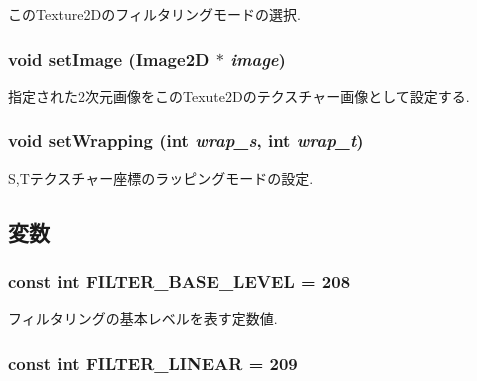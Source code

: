 このTexture2Dのフィルタリングモードの選択. \hypertarget{classm3g_1_1Texture2D_705b89b41cd1b38f664ed912be44baaa}{
\subsubsection[{setImage}]{\setlength{\rightskip}{0pt plus 5cm}void setImage ({\bf Image2D} $\ast$ {\em image})}}
\label{classm3g_1_1Texture2D_705b89b41cd1b38f664ed912be44baaa}


指定された2次元画像をこのTexute2Dのテクスチャー画像として設定する. \hypertarget{classm3g_1_1Texture2D_e676f34bd2f5ee1508ad1cb771702d8f}{
\subsubsection[{setWrapping}]{\setlength{\rightskip}{0pt plus 5cm}void setWrapping (int {\em wrap\_\-s}, \/  int {\em wrap\_\-t})}}
\label{classm3g_1_1Texture2D_e676f34bd2f5ee1508ad1cb771702d8f}


S,Tテクスチャー座標のラッピングモードの設定. 

\subsection{変数}
\hypertarget{classm3g_1_1Texture2D_d1924d32385b5353ad11ecd8b1ec0ad5}{
\subsubsection[{FILTER\_\-BASE\_\-LEVEL}]{\setlength{\rightskip}{0pt plus 5cm}const int {\bf FILTER\_\-BASE\_\-LEVEL} = 208}}
\label{classm3g_1_1Texture2D_d1924d32385b5353ad11ecd8b1ec0ad5}


フィルタリングの基本レベルを表す定数値. \hypertarget{classm3g_1_1Texture2D_5f06003f50141919a3665d22f55602a8}{
\subsubsection[{FILTER\_\-LINEAR}]{\setlength{\rightskip}{0pt plus 5cm}const int {\bf FILTER\_\-LINEAR} = 209}}
\label{classm3g_1_1Texture2D_5f06003f50141919a3665d22f55602a8}


